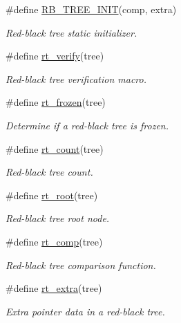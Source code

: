 \begin{CompactItemize}
\item 
\#define \hyperlink{group__dbprim__rbtree_a14}{RB\_\-TREE\_\-INIT}(comp, extra)
\begin{CompactList}\small\item\em Red-black tree static initializer.\item\end{CompactList}\item 
\#define \hyperlink{group__dbprim__rbtree_a15}{rt\_\-verify}(tree)
\begin{CompactList}\small\item\em Red-black tree verification macro.\item\end{CompactList}\item 
\#define \hyperlink{group__dbprim__rbtree_a16}{rt\_\-frozen}(tree)
\begin{CompactList}\small\item\em Determine if a red-black tree is frozen.\item\end{CompactList}\item 
\#define \hyperlink{group__dbprim__rbtree_a17}{rt\_\-count}(tree)
\begin{CompactList}\small\item\em Red-black tree count.\item\end{CompactList}\item 
\#define \hyperlink{group__dbprim__rbtree_a18}{rt\_\-root}(tree)
\begin{CompactList}\small\item\em Red-black tree root node.\item\end{CompactList}\item 
\#define \hyperlink{group__dbprim__rbtree_a19}{rt\_\-comp}(tree)
\begin{CompactList}\small\item\em Red-black tree comparison function.\item\end{CompactList}\item 
\#define \hyperlink{group__dbprim__rbtree_a20}{rt\_\-extra}(tree)
\begin{CompactList}\small\item\em Extra pointer data in a red-black tree.\item\end{CompactList}\item 

\end{CompactItemize}
